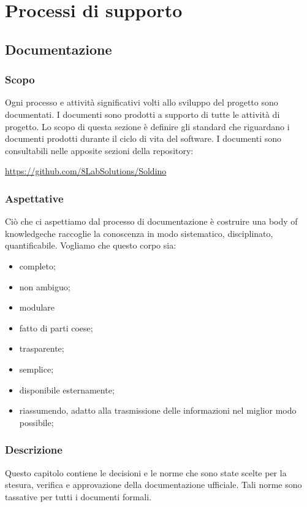 \section{Processi di supporto}
\subsection{Documentazione}
	\subsubsection{Scopo}
	Ogni processo e attività significativi volti allo sviluppo del progetto sono documentati. I documenti sono prodotti a supporto di tutte le attività di progetto. Lo scopo di questa sezione è definire gli standard che riguardano i documenti prodotti durante il ciclo di vita del software.
	I documenti sono consultabili nelle apposite sezioni della repository\glo:\\
	\centerline{\url{https://github.com/8LabSolutions/Soldino}} 		
	\subsubsection{Aspettative}
	Ciò che ci aspettiamo dal processo di documentazione è costruire una body of knowledge\glosp che raccoglie la conoscenza in modo sistematico, disciplinato, quantificabile. Vogliamo che questo corpo sia:
	\begin{itemize}
		\item completo;
		\item non ambiguo;
		\item modulare
		\item fatto di parti coese;
		\item trasparente;
		\item semplice;
		\item disponibile esternamente;
		\item riassumendo, adatto alla trasmissione delle informazioni nel miglior modo possibile;
	\end{itemize}

	\subsubsection{Descrizione}
	Questo capitolo contiene le decisioni e le norme che sono state scelte per la
	stesura, verifica e approvazione della documentazione ufficiale.  Tali norme  sono  tassative  per  tutti  i  documenti  formali.
